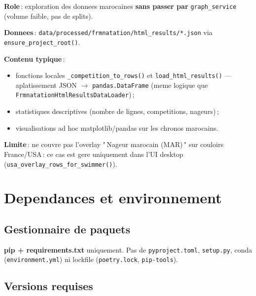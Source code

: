\documentclass[11pt,a4paper]{article}
\begin{document}
\textbf{Role}\,: exploration des donnees marocaines \textbf{sans passer par} \texttt{graph\_service} (volume faible, pas de splits).

\textbf{Donnees}\,: \texttt{data/processed/frmnatation/html\_results/*.json} via \texttt{ensure\_project\_root()}.

\textbf{Contenu typique}\,:
\begin{itemize}
  \item fonctions locales \texttt{\_competition\_to\_rows()} et \texttt{load\_html\_results()} --- aplatissement JSON $\rightarrow$ \texttt{pandas.DataFrame} (meme logique que \texttt{FrmnatationHtmlResultsDataLoader})\,;
  \item statistiques descriptives (nombre de lignes, competitions, nageurs)\,;
  \item visualisations ad hoc matplotlib/pandas sur les chronos marocains.
\end{itemize}

\textbf{Limite}\,: ne couvre pas l'overlay "\,Nageur marocain (MAR)\," sur couloirs France/USA\,: ce cas est gere uniquement dans l'UI desktop (\texttt{usa\_overlay\_rows\_for\_swimmer()}).

\section{Dependances et environnement}

\subsection{Gestionnaire de paquets}

\textbf{pip + requirements.txt} uniquement. Pas de \texttt{pyproject.toml}, \texttt{setup.py}, conda (\texttt{environment.yml}) ni lockfile (\texttt{poetry.lock}, \texttt{pip-tools}).

\subsection{Versions requises}
\end{document}
